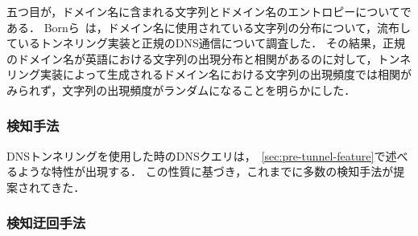 五つ目が，ドメイン名に含まれる文字列とドメイン名のエントロピーについてである．
Bornら~\cite{born}は，ドメイン名に使用されている文字列の分布について，流布しているトンネリング実装と正規のDNS通信について調査した．
その結果，正規のドメイン名が英語における文字列の出現分布と相関があるのに対して，トンネリング実装によって生成されるドメイン名における文字列の出現頻度では相関がみられず，文字列の出現頻度がランダムになることを明らかにした．


\subsubsection{検知手法}
DNSトンネリングを使用した時のDNSクエリは，~\ref{sec:pre-tunnel-feature}で述べるような特性が出現する．
この性質に基づき，これまでに多数の検知手法が提案されてきた．


\subsubsection{検知迂回手法}
\label{sec:bypass-method}

